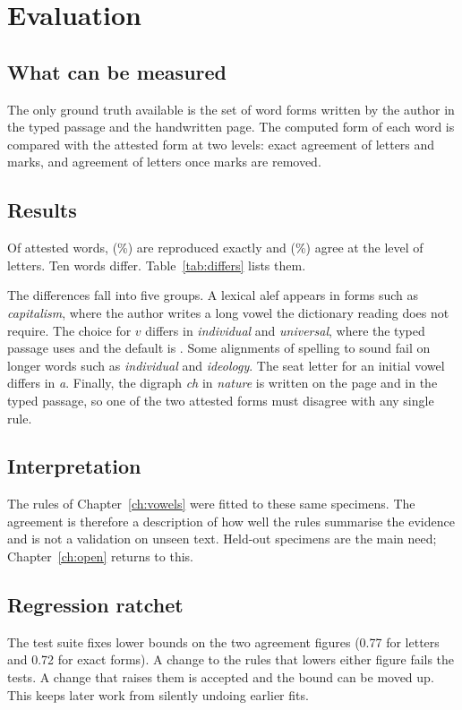 \chapter{Evaluation}\label{ch:eval}

\section{What can be measured}
The only ground truth available is the set of \NAttested{} word forms written by the author in the typed passage and the handwritten page. The computed form of each word is compared with the attested form at two levels: exact agreement of letters and marks, and agreement of letters once marks are removed.

\section{Results}
Of \NAttested{} attested words, \NExact{} (\PctExact\%) are reproduced exactly and \NLetters{} (\PctLetters\%) agree at the level of letters. Ten words differ. Table~\ref{tab:differs} lists them.

The differences fall into five groups. A lexical alef appears in forms such as \emph{capitalism}, where the author writes a long vowel the dictionary reading does not require. The choice for $v$ differs in \emph{individual} and \emph{universal}, where the typed passage uses  and the default is . Some alignments of spelling to sound fail on longer words such as \emph{individual} and \emph{ideology}. The seat letter for an initial vowel differs in \emph{a}. Finally, the digraph \emph{ch} in \emph{nature} is written  on the page and  in the typed passage, so one of the two attested forms must disagree with any single rule.

\section{Interpretation}
The rules of Chapter~\ref{ch:vowels} were fitted to these same specimens. The agreement is therefore a description of how well the rules summarise the evidence and is not a validation on unseen text. Held-out specimens are the main need; Chapter~\ref{ch:open} returns to this.

\section{Regression ratchet}
The test suite fixes lower bounds on the two agreement figures (0.77 for letters and 0.72 for exact forms). A change to the rules that lowers either figure fails the tests. A change that raises them is accepted and the bound can be moved up. This keeps later work from silently undoing earlier fits.

